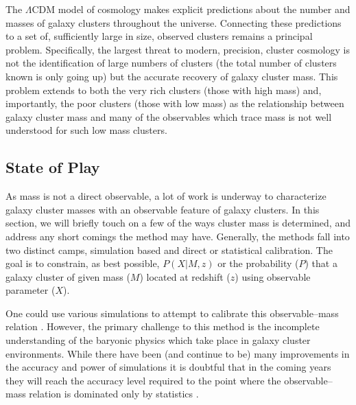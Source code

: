 \documentclass[12pt]{article}
\begin{document}
The $\Lambda$CDM model of cosmology makes explicit predictions about the number and masses of galaxy clusters throughout the universe. Connecting these predictions to a set of, sufficiently large in size, observed clusters remains a principal problem. Specifically, the largest threat to modern, precision, cluster cosmology is not the identification of large numbers of clusters (the total number of clusters known is only going up) but the accurate recovery of galaxy cluster mass. This problem extends to both the very rich clusters (those with high mass) and, importantly, the poor clusters (those with low mass) as the relationship between galaxy cluster mass and many of the observables which trace mass is not well understood for such low mass clusters.

\subsection{State of Play}
As mass is not a direct observable, a lot of work is underway to characterize galaxy cluster masses with an observable feature of galaxy clusters. In this section, we will briefly touch on a few of the ways cluster mass is determined, and address any short comings the method may have. Generally, the methods fall into two distinct camps, simulation based and direct or statistical calibration. The goal is to constrain, as best possible, $P(X|M,z)$ or the probability ($P$) that a galaxy cluster of given mass ($M$) located at redshift ($z$) using observable parameter ($X$).

One could use various simulations to attempt to calibrate this observable--mass relation . However, the primary challenge to this method is the incomplete understanding of the baryonic physics which take place in galaxy cluster environments. While there have been (and continue to be) many improvements in the accuracy and power of simulations it is doubtful that in the coming years they will reach the accuracy level required to the point where the observable--mass relation is dominated only by statistics \citep{Weinberg2013}. 
 
\end{document}

